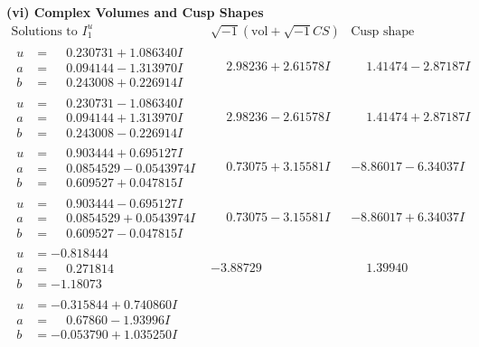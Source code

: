 \documentclass[1p]{elsarticle_modified}
\theoremstyle{definition}
\newcommand{\I}{\sqrt{-1}}
\begin{document}
\newpage\flushleft \textbf{(vi) Complex Volumes and Cusp Shapes}
$$\begin{array}{c|c|c}  
\text{Solutions to }I^u_{1}& \I (\text{vol} + \sqrt{-1}CS) & \text{Cusp shape}\\
 \hline 
\begin{aligned}
u &= \phantom{-}0.230731 + 1.086340 I \\
a &= \phantom{-}0.094144 - 1.313970 I \\
b &= \phantom{-}0.243008 + 0.226914 I\end{aligned}
 & \phantom{-}2.98236 + 2.61578 I & \phantom{-}1.41474 - 2.87187 I \\ \hline\begin{aligned}
u &= \phantom{-}0.230731 - 1.086340 I \\
a &= \phantom{-}0.094144 + 1.313970 I \\
b &= \phantom{-}0.243008 - 0.226914 I\end{aligned}
 & \phantom{-}2.98236 - 2.61578 I & \phantom{-}1.41474 + 2.87187 I \\ \hline\begin{aligned}
u &= \phantom{-}0.903444 + 0.695127 I \\
a &= \phantom{-}0.0854529 - 0.0543974 I \\
b &= \phantom{-}0.609527 + 0.047815 I\end{aligned}
 & \phantom{-}0.73075 + 3.15581 I & -8.86017 - 6.34037 I \\ \hline\begin{aligned}
u &= \phantom{-}0.903444 - 0.695127 I \\
a &= \phantom{-}0.0854529 + 0.0543974 I \\
b &= \phantom{-}0.609527 - 0.047815 I\end{aligned}
 & \phantom{-}0.73075 - 3.15581 I & -8.86017 + 6.34037 I \\ \hline\begin{aligned}
u &= -0.818444\phantom{ +0.000000I} \\
a &= \phantom{-}0.271814\phantom{ +0.000000I} \\
b &= -1.18073\phantom{ +0.000000I}\end{aligned}
 & -3.88729\phantom{ +0.000000I} & \phantom{-}1.39940\phantom{ +0.000000I} \\ \hline\begin{aligned}
u &= -0.315844 + 0.740860 I \\
a &= \phantom{-}0.67860 - 1.93996 I \\
b &= -0.053790 + 1.035250 I\end{aligned}

\end{array}$$
\end{document}

